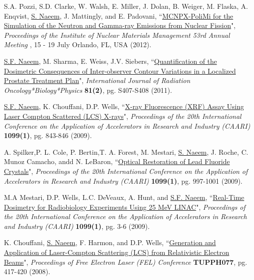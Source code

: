 \documentclass[paper=letter,fontsize=11pt]{scrartcl} %
\newcommand{\PaperEntry}[7]{
		\noindent #1, ``\href{#7}{#2}", \textit{#3} \textbf{#4}, #5 (#6).}
\begin{document}
\begin{etaremune}
\item \PaperEntry{S.A. Pozzi, S.D. Clarke, W. Walsh, E. Miller, J. Dolan, B. Weiger, M. Flaska, A. Enqvist, \underline{S. Naeem}, J. Mattingly, and E. Padovani}{MCNPX-PoliMi for the Simulation of the Neutron and Gamma-ray Emissions from Nuclear Fission}{Proceedings of the Institute of Nuclear Materials Management 53rd Annual Meeting} {}{15 - 19 July Orlando, FL, USA}{2012}
{}

\item \PaperEntry{\underline{S.F. Naeem}, M. Sharma, E. Weiss, J.V. Siebers}{Quantification of the Dosimetric Consequences of Inter-observer Contour Variations in a Localized Prostate Treatment Plan}{International Journal of Radiation Oncology*Biology*Physics}{81(2)}{pg. S407-S408}{2011}
{}

\item \PaperEntry{\underline{S.F. Naeem}, K. Chouffani, D.P. Wells}{X-ray Fluorescence (XRF) Assay Using Laser Compton Scattered (LCS) X-rays}{Proceedings of the 20th International Conference on the Application of Accelerators in Research and Industry (CAARI)}{1099(1)}{pg. 843-846}{2009}
{http://dx.doi.org/10.1063/1.3120170}

\item \PaperEntry{A. Spilker,P. L. Cole, P. Bertin,T. A. Forest, M. Mestari, \underline{S. Naeem}, J. Roche,  C. Munoz Camacho, andd N. LeBaron}{Optical Restoration of Lead Fluoride Crystals}{Proceedings of the 20th International Conference on the Application of Accelerators in Research and Industry (CAARI)}{1099(1)}{pg. 997-1001}{2009}
{http://dx.doi.org/10.1063/1.3120211}

\item \PaperEntry{M.A Mestari, D.P. Wells, L.C. DeVeaux, A. Hunt, and \underline{S.F. Naeem}}{Real-Time Dosimetry for Radiobiology Experiments Using 25 MeV LINAC}{Proceedings of the 20th International Conference on the Application of Accelerators in Research and Industry (CAARI)}{1099(1)}{pg. 3-6}{2009}
{http://dx.doi.org/10.1063/1.3120062}

\item \PaperEntry{K. Chouffani, \underline{S. Naeem}, F. Harmon, and D.P. Wells}{Generation and Application of Laser-Compton Scattering (LCS) from Relativistic Electron Beams}{ Proceedings of Free Electron Laser (FEL) Conference}{TUPPH077}{pg. 417-420}{2008}
{http://accelconf.web.cern.ch/accelconf/fel2008/papers/tupph077.pdf}

\end{etaremune}
\end{document}
